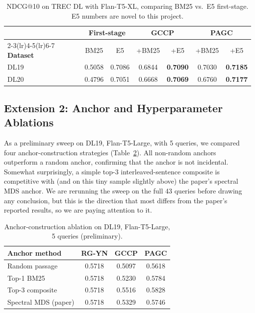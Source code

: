 \documentclass[conference]{IEEEtran}
\begin{document}
\begin{table}[h]
\centering
\small
\begin{tabular}{@{}lcccccc@{}}
\toprule
 & \multicolumn{2}{c}{\textbf{First-stage}}
 & \multicolumn{2}{c}{\textbf{GCCP}}
 & \multicolumn{2}{c}{\textbf{PAGC}} \\
\cmidrule(lr){2-3}\cmidrule(lr){4-5}\cmidrule(lr){6-7}
\textbf{Dataset} & BM25 & E5 & +BM25 & +E5 & +BM25 & +E5 \\
\midrule
DL19 & 0.5058 & 0.7086 & 0.6844 & \textbf{0.7090} & 0.7030 & \textbf{0.7185} \\
DL20 & 0.4796 & 0.7051 & 0.6668 & \textbf{0.7069} & 0.6760 & \textbf{0.7177} \\
\bottomrule
\end{tabular}
\caption{NDCG@10 on TREC DL with Flan-T5-XL, comparing BM25 vs.\ E5 first-stage. E5 numbers are novel to this project.}
\label{tab:e5}
\end{table}

\subsection{Extension 2: Anchor and Hyperparameter Ablations}

As a preliminary sweep on DL19, Flan-T5-Large, with 5 queries, we compared four anchor-construction strategies (Table~\ref{tab:anchor}). All non-random anchors outperform a random anchor, confirming that the anchor is not incidental. Somewhat surprisingly, a simple top-3 interleaved-sentence composite is competitive with (and on this tiny sample slightly above) the paper's spectral MDS anchor. We are rerunning the sweep on the full 43 queries before drawing any conclusion, but this is the direction that most differs from the paper's reported results, so we are paying attention to it.

\begin{table}[h]
\centering
\small
\begin{tabular}{@{}lccc@{}}
\toprule
\textbf{Anchor method} & \textbf{RG-YN} & \textbf{GCCP} & \textbf{PAGC} \\
\midrule
Random passage           & 0.5718 & 0.5097 & 0.5618 \\
Top-1 BM25               & 0.5718 & 0.5230 & 0.5784 \\
Top-3 composite          & 0.5718 & 0.5516 & 0.5828 \\
Spectral MDS (paper)     & 0.5718 & 0.5329 & 0.5746 \\
\bottomrule
\end{tabular}
\caption{Anchor-construction ablation on DL19, Flan-T5-Large, 5 queries (preliminary).}
\label{tab:anchor}
\end{table}
\end{document}
